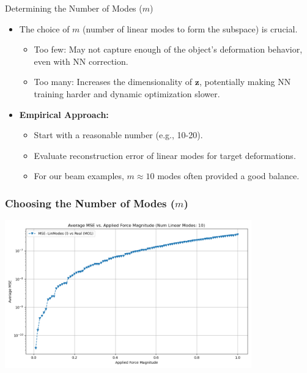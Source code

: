 \documentclass{beamer}
\begin{document}
\begin{frame}{Determining the Number of Modes (\(m\))}
    \begin{itemize}
        \item The choice of \(m\) (number of linear modes to form the subspace) is crucial.
        \begin{itemize}
            \item Too few: May not capture enough of the object's deformation behavior, even with NN correction.
            \item Too many: Increases the dimensionality of \(\bm{z}\), potentially making NN training harder and dynamic optimization slower.
        \end{itemize}
        \item \textbf{Empirical Approach:}
        \begin{itemize}
            \item Start with a reasonable number (e.g., 10-20).
            \item Evaluate reconstruction error of linear modes for target deformations.
            \item For our beam examples, \(m \approx 10\) modes often provided a good balance.
        \end{itemize}
    \end{itemize}
\end{frame}

\begin{frame}
    \frametitle{Choosing the Number of Modes (\(m\))}
    \begin{centering}
        \includegraphics[width=0.8\textwidth]{Images/mse_10_modes.png}
    \end{centering}

\end{frame}
\end{document}
